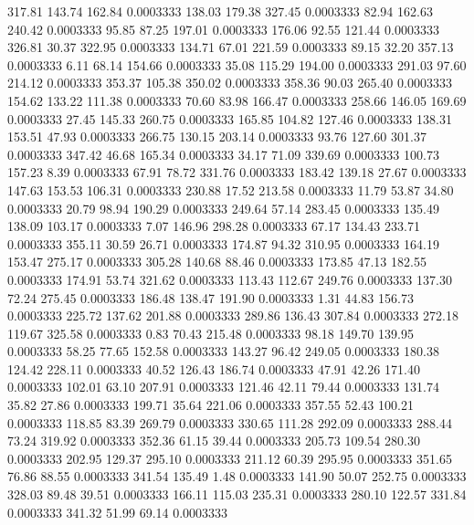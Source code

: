 317.81  143.74  162.84   0.0003333
 138.03  179.38  327.45   0.0003333
  82.94  162.63  240.42   0.0003333
  95.85   87.25  197.01   0.0003333
 176.06   92.55  121.44   0.0003333
 326.81   30.37  322.95   0.0003333
 134.71   67.01  221.59   0.0003333
  89.15   32.20  357.13   0.0003333
   6.11   68.14  154.66   0.0003333
  35.08  115.29  194.00   0.0003333
 291.03   97.60  214.12   0.0003333
 353.37  105.38  350.02   0.0003333
 358.36   90.03  265.40   0.0003333
 154.62  133.22  111.38   0.0003333
  70.60   83.98  166.47   0.0003333
 258.66  146.05  169.69   0.0003333
  27.45  145.33  260.75   0.0003333
 165.85  104.82  127.46   0.0003333
 138.31  153.51   47.93   0.0003333
 266.75  130.15  203.14   0.0003333
  93.76  127.60  301.37   0.0003333
 347.42   46.68  165.34   0.0003333
  34.17   71.09  339.69   0.0003333
 100.73  157.23    8.39   0.0003333
  67.91   78.72  331.76   0.0003333
 183.42  139.18   27.67   0.0003333
 147.63  153.53  106.31   0.0003333
 230.88   17.52  213.58   0.0003333
  11.79   53.87   34.80   0.0003333
  20.79   98.94  190.29   0.0003333
 249.64   57.14  283.45   0.0003333
 135.49  138.09  103.17   0.0003333
   7.07  146.96  298.28   0.0003333
  67.17  134.43  233.71   0.0003333
 355.11   30.59   26.71   0.0003333
 174.87   94.32  310.95   0.0003333
 164.19  153.47  275.17   0.0003333
 305.28  140.68   88.46   0.0003333
 173.85   47.13  182.55   0.0003333
 174.91   53.74  321.62   0.0003333
 113.43  112.67  249.76   0.0003333
 137.30   72.24  275.45   0.0003333
 186.48  138.47  191.90   0.0003333
   1.31   44.83  156.73   0.0003333
 225.72  137.62  201.88   0.0003333
 289.86  136.43  307.84   0.0003333
 272.18  119.67  325.58   0.0003333
   0.83   70.43  215.48   0.0003333
  98.18  149.70  139.95   0.0003333
  58.25   77.65  152.58   0.0003333
 143.27   96.42  249.05   0.0003333
 180.38  124.42  228.11   0.0003333
  40.52  126.43  186.74   0.0003333
  47.91   42.26  171.40   0.0003333
 102.01   63.10  207.91   0.0003333
 121.46   42.11   79.44   0.0003333
 131.74   35.82   27.86   0.0003333
 199.71   35.64  221.06   0.0003333
 357.55   52.43  100.21   0.0003333
 118.85   83.39  269.79   0.0003333
 330.65  111.28  292.09   0.0003333
 288.44   73.24  319.92   0.0003333
 352.36   61.15   39.44   0.0003333
 205.73  109.54  280.30   0.0003333
 202.95  129.37  295.10   0.0003333
 211.12   60.39  295.95   0.0003333
 351.65   76.86   88.55   0.0003333
 341.54  135.49    1.48   0.0003333
 141.90   50.07  252.75   0.0003333
 328.03   89.48   39.51   0.0003333
 166.11  115.03  235.31   0.0003333
 280.10  122.57  331.84   0.0003333
 341.32   51.99   69.14   0.0003333

